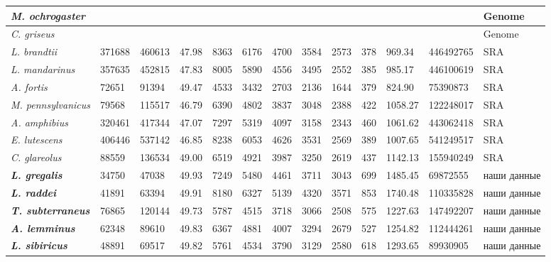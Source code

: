 \begin{landscape}
\begin{longtable}{|p{4.2cm}|p{1.5cm}|p{2.2cm}|p{1cm}|p{1cm}|p{1cm}|p{1cm}|p{1cm}|p{1cm}|p{1.5cm}|p{1.5cm}|p{2cm}|p{2.5cm}|}
				\textit{M. ochrogaster} & \multicolumn{1}{l|}{} & \multicolumn{1}{l|}{} &  & \multicolumn{1}{l|}{} & \multicolumn{1}{l|}{} & \multicolumn{1}{l|}{} & \multicolumn{1}{l|}{} & \multicolumn{1}{l|}{} & \multicolumn{1}{l|}{} &  &  & Genome \\ \hline
				\textit{C. griseus} & \multicolumn{1}{l|}{} & \multicolumn{1}{l|}{} &  & \multicolumn{1}{l|}{} & \multicolumn{1}{l|}{} & \multicolumn{1}{l|}{} & \multicolumn{1}{l|}{} & \multicolumn{1}{l|}{} & \multicolumn{1}{l|}{} &  &  & Genome \\ \hline
				\textit{L. brandtii} & 371688 & 460613 & 47.98 & 8363 & 6176 & 4700 & 3584 & 2573 & 378 & 969.34 & 446492765 & SRA \\ \hline
				\textit{L. mandarinus} & 357635 & 452815 & 47.83 & 8005 & 5890 & 4556 & 3495 & 2552 & 385 & 985.17 & 446100619 & SRA \\ \hline
				\textit{A. fortis} & 72651 & 91394 & 49.47 & 4533 & 3432 & 2703 & 2136 & 1644 & 379 & 824.90 & 75390873 & SRA \\ \hline
				\textit{M. pennsylvanicus} & 79568 & 115517 & 46.79 & 6390 & 4802 & 3837 & 3048 & 2388 & 422 & 1058.27 & 122248017 & SRA \\ \hline
				\textit{A. amphibius} & 320461 & 417344 & 47.07 & 7297 & 5319 & 4097 & 3158 & 2343 & 460 & 1061.62 & 443062418 & SRA \\ \hline
				\textit{E. lutescens} & 406446 & 537142 & 46.85 & 8238 & 6053 & 4626 & 3531 & 2569 & 389 & 1007.65 & 541249517 & SRA \\ \hline
				\textit{C. glareolus} & 88559 & 136534 & 49.00 & 6519 & 4921 & 3987 & 3250 & 2619 & 437 & 1142.13 & 155940249 & SRA \\ \hline
				\textit{\textbf{L. gregalis}} & 34750 & 47038 & 49.93 & 7249 & 5480 & 4461 & 3711 & 3043 & 699 & 1485.45 & 69872555 & наши данные \\ \hline
				\textit{\textbf{L. raddei}} & 41891 & 63394 & 49.91 & 8180 & 6327 & 5139 & 4320 & 3571 & 853 & 1740.48 & 110335828 & наши данные \\ \hline
				\textit{\textbf{T. subterraneus}} & 76865 & 120144 & 49.73 & 5787 & 4515 & 3718 & 3066 & 2508 & 575 & 1227.63 & 147492207 & наши данные \\ \hline
				\textit{\textbf{A. lemminus}} & 62348 & 89610 & 49.83 & 6367 & 4881 & 4007 & 3294 & 2679 & 527 & 1254.82 & 112444261 & наши данные \\ \hline
				\textit{\textbf{L. sibiricus}} & 48891 & 69517 & 49.82 & 5761 & 4534 & 3790 & 3129 & 2580 & 618 & 1293.65 & 89930905 & наши данные \\ \hline

\end{longtable}
\end{landscape}
